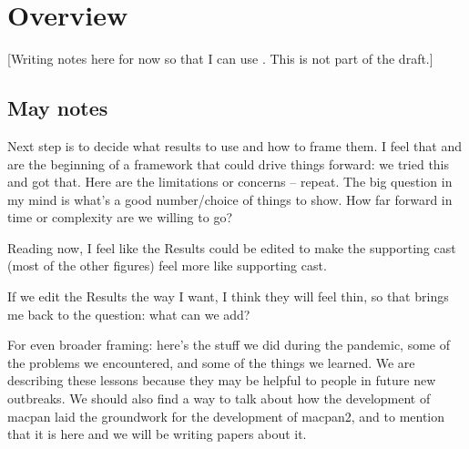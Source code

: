 \documentclass[12pt]{article}\usepackage[]{graphicx}\usepackage[]{color}
\begin{document}

\tableofcontents




\section*{Overview}

[Writing notes here for now so that I can use . This is not part of the draft.]

\subsection*{May notes}

Next step is to decide what results to use and how to frame them. I feel that  and  are the beginning of a framework that could drive things forward: we tried this and got that. Here are the limitations or concerns – repeat. The big question in my mind is what's a good number/choice of things to show. How far forward in time or complexity are we willing to go? 

Reading now, I feel like the Results could be edited to make the supporting cast (most of the other figures) feel more like supporting cast. 

If we edit the Results the way I want, I think they will feel thin, so that brings me back to the question: what can we add? 

For even broader framing: here's the stuff we did during the pandemic, some of the problems we encountered, and some of the things we learned. We are describing these lessons because they may be helpful to people in future new outbreaks. We should also find a way to talk about how the development of macpan laid the groundwork for the development of macpan2, and to mention that it is here and we will be writing papers about it. 
\end{document}
